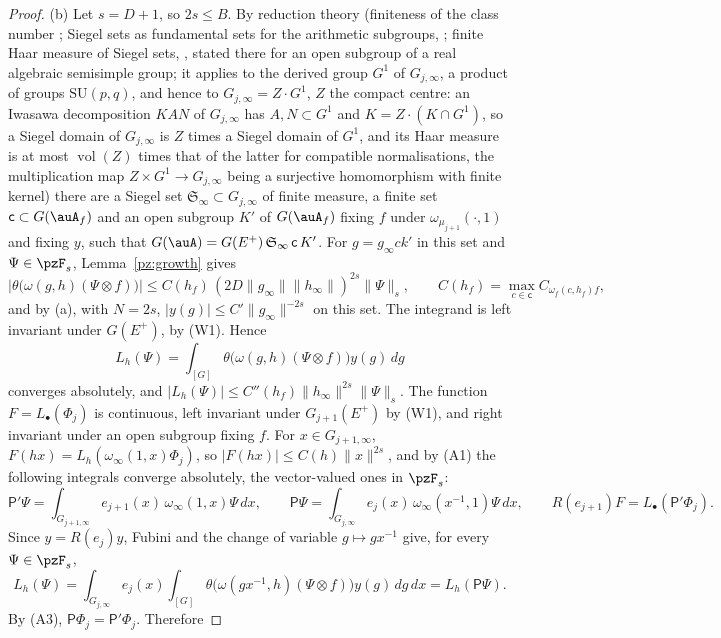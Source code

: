 \documentclass[10pt]{amsart}
\theoremstyle{definition}
\theoremstyle{remark}
\begin{document}
\begin{proof}
(b) Let $s=D+1$, so $2s\le B$. By reduction theory (finiteness of the class number \cite[Theorem~5.1]{BorelFin}; Siegel sets as fundamental sets for the arithmetic subgroups, \cite[Theorem~6.5, and Theorem~12.3 over a number field]{BorelHC1962}; finite Haar measure of Siegel sets, \cite[Proposition~4.3]{BorelHC1962}, stated there for an open subgroup of a real algebraic semisimple group; it applies to the derived group $G^1$ of $G_{j,\infty}$, a product of groups $\mathrm{SU}(p,q)$, and hence to $G_{j,\infty}=Z\cdot G^1$, $Z$ the compact centre: an Iwasawa decomposition $KAN$ of $G_{j,\infty}$ has $A,N\subset G^1$ and $K=Z\cdot(K\cap G^1)$, so a Siegel domain of $G_{j,\infty}$ is $Z$ times a Siegel domain of $G^1$, and its Haar measure is at most $\operatorname{vol}(Z)$ times that of the latter for compatible normalisations, the multiplication map $Z\times G^1\to G_{j,\infty}$ being a surjective homomorphism with finite kernel) there are a Siegel set
$\mathfrak S_\infty\subset G_{j,\infty}$ of finite measure, a finite set $\mathsf c\subset G(\auA_f)$
and an open subgroup $K'$ of $G(\auA_f)$ fixing $f$ under $\omega_{\mu_{j+1}}(\cdot,1)$ and fixing
$y$, such that $G(\auA)=G(E^+)\,\mathfrak S_\infty\,\mathsf c\,K'$. For $g=g_\infty ck'$ in this set
and $\Psi\in\pzF_s$, Lemma~\ref{pz:growth} gives
\[
\bigl|\theta\bigl(\omega(g,h)(\Psi\otimes f)\bigr)\bigr|\le C(h_f)\,(2D\|g_\infty\|\|h_\infty\|)^{2s}
\|\Psi\|_s,\qquad C(h_f)=\max_{c\in\mathsf c}C_{\omega_f(c,h_f)f},
\]
and by (a), with $N=2s$, $|y(g)|\le C'\|g_\infty\|^{-2s}$ on this set. The integrand is left invariant under
$G(E^+)$, by (W1). Hence
\[
L_h(\Psi)=\int_{[G]}\theta\bigl(\omega(g,h)(\Psi\otimes f)\bigr)y(g)\,dg
\]
converges absolutely, and $|L_h(\Psi)|\le C''(h_f)\|h_\infty\|^{2s}\|\Psi\|_s$. The function
$F=L_\bullet(\Phi_j)$ is continuous, left invariant under $G_{j+1}(E^+)$ by (W1), and right
invariant under an open subgroup fixing $f$. For $x\in G_{j+1,\infty}$, $F(hx)=L_h(\omega_\infty(1,x)
\Phi_j)$, so $|F(hx)|\le C(h)\|x\|^{2s}$, and by (A1) the following integrals converge absolutely,
the vector-valued ones in $\pzF_s$:
\[
\mathsf P'\Psi=\int_{G_{j+1,\infty}}e_{j+1}(x)\,\omega_\infty(1,x)\Psi\,dx,\qquad\mathsf P\Psi=
\int_{G_{j,\infty}}e_j(x)\,\omega_\infty(x^{-1},1)\Psi\,dx,\qquad R(e_{j+1})F=L_\bullet(\mathsf P'\Phi_j).
\]
Since $y=R(e_j)y$, Fubini and the change of variable
$g\mapsto gx^{-1}$ give, for every $\Psi\in\pzF_s$,
\[
L_h(\Psi)=\int_{G_{j,\infty}}e_j(x)\int_{[G]}\theta\bigl(\omega(gx^{-1},h)(\Psi\otimes f)\bigr)y(g)\,dg
\,dx=L_h(\mathsf P\Psi).
\]
By (A3), $\mathsf P\Phi_j=\mathsf P'\Phi_j$. Therefore

\end{proof}
\end{document}
